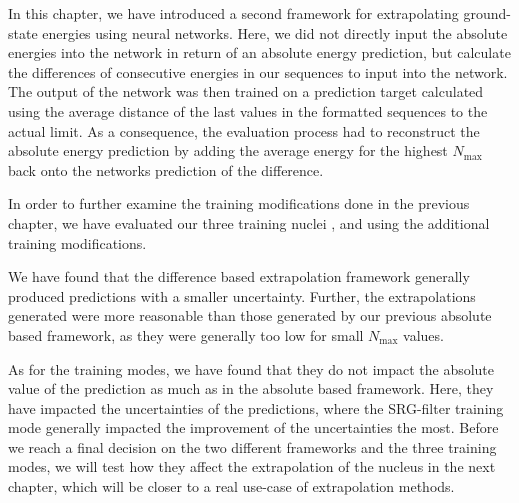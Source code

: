 In this chapter, we have introduced a second framework for extrapolating ground-state energies using neural networks. Here, we did not directly input the absolute energies into the network in return of an absolute energy prediction, but calculate the differences of consecutive energies in our sequences to input into the network. The output of the network was then trained on a prediction target calculated using the average distance of the last values in the formatted sequences to the actual limit. As a consequence, the evaluation process had to reconstruct the absolute energy prediction by adding the average energy for the highest $N_\mathrm{max}$ back onto the networks prediction of the difference.

In order to further examine the training modifications done in the previous chapter, we have evaluated our three training nuclei ,  and  using the additional training modifications.

We have found that the difference based extrapolation framework generally produced predictions with a smaller uncertainty. Further, the extrapolations generated were more reasonable than those generated by our previous absolute based framework, as they were generally too low for small $N_\mathrm{max}$ values.

As for the training modes, we have found that they do not impact the absolute value of the prediction as much as in the absolute based framework. Here, they have impacted the uncertainties of the predictions, where the SRG-filter training mode generally impacted the improvement of the uncertainties the most.
Before we reach a final decision on the two different frameworks and the three training modes, we will test how they affect the extrapolation of the nucleus  in the next chapter, which will be closer to a real use-case of extrapolation methods.

